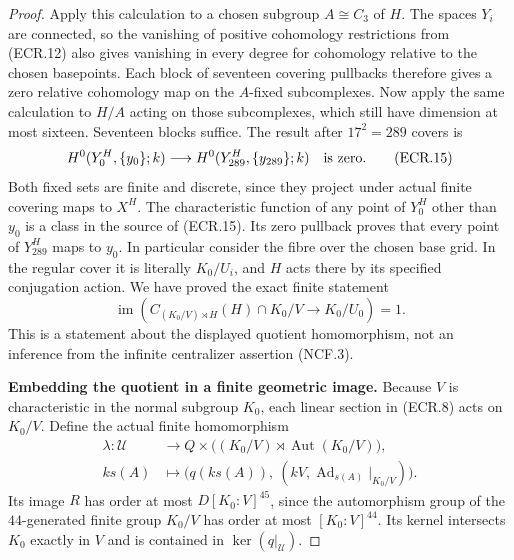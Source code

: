 \begin{proof}
Apply this calculation to a chosen subgroup $A\cong C_3$ of $H$.
The spaces $Y_i$ are connected, so the vanishing of positive
cohomology restrictions from (ECR.12) also gives vanishing in every
degree for cohomology relative to the chosen basepoints.
Each block of seventeen covering pullbacks therefore gives a zero
relative cohomology map on the $A$-fixed subcomplexes.  Now apply the
same calculation to $H/A$ acting on those subcomplexes, which still
have dimension at most sixteen.  Seventeen blocks suffice.  The
result after $17^2=289$ covers is
\[
 H^0(Y_0^H,\{y_0\};k)\longrightarrow
                   H^0(Y_{289}^H,\{y_{289}\};k)
                         \quad\hbox{is zero}.                  \tag{ECR.15}
\]
Both fixed sets are finite and discrete, since they project under
actual finite covering maps to $X^H$.  The characteristic function of
any point of $Y_0^H$ other than $y_0$ is a class in the source of
(ECR.15).  Its zero pullback proves that every point of $Y_{289}^H$
maps to $y_0$.  In particular consider the fibre over the chosen base
grid.  In the regular cover it is literally $K_0/U_i$, and $H$ acts
there by its specified conjugation action.  We have proved the exact
finite statement
\[
 \operatorname{im}\left(
 C_{(K_0/V)\rtimes H}(H)\cap K_0/V
                       \longrightarrow K_0/U_0\right)=1.
                                                               \tag{ECR.16}
\]
This is a statement about the displayed quotient homomorphism, not
an inference from the infinite centralizer assertion (NCF.3).

\par\medskip\noindent\textbf{Embedding the quotient in a finite geometric image.}\quad
Because $V$ is characteristic in the normal subgroup $K_0$, each
linear section in (ECR.8) acts on $K_0/V$.  Define the actual finite
homomorphism
\[
 \begin{split}
 \lambda:\mathcal U&\longrightarrow
          Q\times\bigl((K_0/V)\rtimes\operatorname{Aut}(K_0/V)\bigr),\\
 k s(A)&\longmapsto
       \bigl(q(k s(A)),\ (kV,\operatorname{Ad}_{s(A)}|_{K_0/V})\bigr).
 \end{split}                                                    \tag{ECR.17}
\]
Its image $R$ has order at most $D [K_0:V]^{45}$, since the
automorphism group of the $44$-generated finite group $K_0/V$ has
order at most $[K_0:V]^{44}$.  Its kernel intersects $K_0$ exactly
in $V$ and is contained in $\ker(q|_{\mathcal U})$.


\end{proof}
